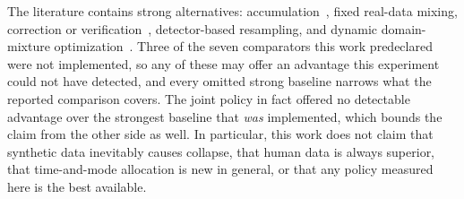 The literature contains strong alternatives: accumulation~\cite{gerstgrasser2024inevitable}, fixed real-data mixing, correction or verification~\cite{gillman2024selfcorrecting}, detector-based resampling, and dynamic domain-mixture optimization~\cite{xie2023doremi}. Three of the seven comparators this work predeclared were not implemented, so any of these may offer an advantage this experiment could not have detected, and every omitted strong baseline narrows what the reported comparison covers. The joint policy in fact offered no detectable advantage over the strongest baseline that \emph{was} implemented, which bounds the claim from the other side as well. In particular, this work does not claim that synthetic data inevitably causes collapse, that human data is always superior, that time-and-mode allocation is new in general, or that any policy measured here is the best available.

